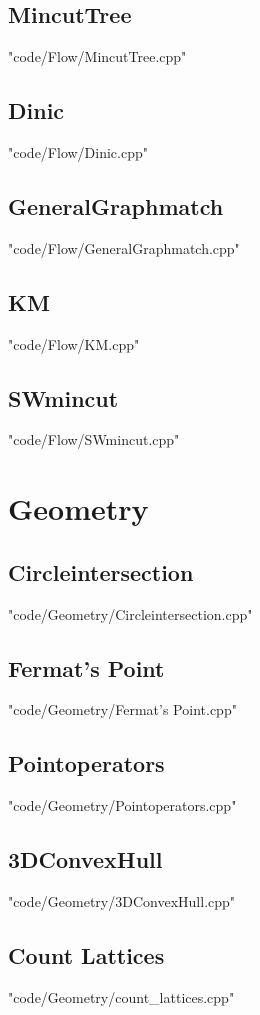 \documentclass [8pt,a4paper,twocolumn]{article}
\begin{document}
\subsection{MincutTree}
 {"code/Flow/MincutTree.cpp"}
\subsection{Dinic}
 {"code/Flow/Dinic.cpp"}
\subsection{GeneralGraphmatch}
 {"code/Flow/GeneralGraphmatch.cpp"}
\subsection{KM}
 {"code/Flow/KM.cpp"}
\subsection{SWmincut}
 {"code/Flow/SWmincut.cpp"}
\section{Geometry}
\subsection{Circleintersection}
 {"code/Geometry/Circleintersection.cpp"}
\subsection{Fermat's Point}
 {"code/Geometry/Fermat's Point.cpp"}
\subsection{Pointoperators}
 {"code/Geometry/Pointoperators.cpp"}
\subsection{3DConvexHull}
 {"code/Geometry/3DConvexHull.cpp"}
\subsection{Count Lattices}
 {"code/Geometry/count_lattices.cpp"}
\end{document}
